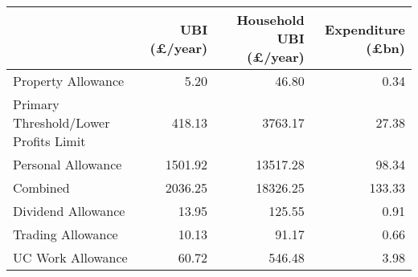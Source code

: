 \begin{tabular}{lrrr}
\toprule
{} &  UBI (£/year) &  Household UBI (£/year) &  Expenditure (£bn) \\
\midrule
Property Allowance                    &          5.20 &                   46.80 &               0.34 \\
Primary Threshold/Lower Profits Limit &        418.13 &                 3763.17 &              27.38 \\
Personal Allowance                    &       1501.92 &                13517.28 &              98.34 \\
Combined                              &       2036.25 &                18326.25 &             133.33 \\
Dividend Allowance                    &         13.95 &                  125.55 &               0.91 \\
Trading Allowance                     &         10.13 &                   91.17 &               0.66 \\
UC Work Allowance                     &         60.72 &                  546.48 &               3.98 \\
\bottomrule
\end{tabular}
